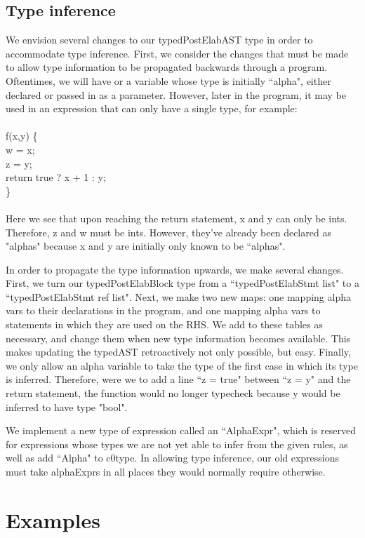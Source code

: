 \documentclass{article}
\begin{document}
\subsection{Type inference}
We envision several changes to our typedPostElabAST type in order to accommodate type inference. First, we consider the changes that must be made to allow type information to be propagated backwards through a program. Oftentimes, we will have or a variable whose type is initially ``alpha", either declared or passed in as a parameter. However, later in the program, it may be used in an expression that can only have a single type, for example:\\
\\
f(x,y) \{\\
  w = x;\\
  z = y;\\
  return true ? x + 1 : y; \\
\} \\
\\
Here we see that upon reaching the return statement, x and y can only be ints. Therefore, z and w must be ints. However, they've already been declared as "alphas" because x and y are initially only known to be ``alphas". 

In order to propagate the type information upwards, we make several changes. First, we turn our typedPostElabBlock type from a ``typedPostElabStmt list" to a ``typedPostElabStmt ref list". Next, we make two new maps: one mapping alpha vars to their declarations in the program, and one mapping alpha vars to statements in which they are used on the RHS. We add to these tables as necessary, and change them when new type information becomes available. This makes updating the typedAST retroactively not only possible, but easy. Finally, we only allow an alpha variable to take the type of the first case in which its type is inferred. Therefore, were we to add a line ``z = true" between ``z = y" and the return statement, the function would no longer typecheck because y would be inferred to have type "bool".

We implement a new type of expression called an ``AlphaExpr", which is reserved for expressions whose types we are not yet able to infer from the given rules, as well as add ``Alpha" to c0type. In allowing type inference, our old expressions must take alphaExprs in all places they would normally require otherwise. 

\section{Examples}
\end{document}

